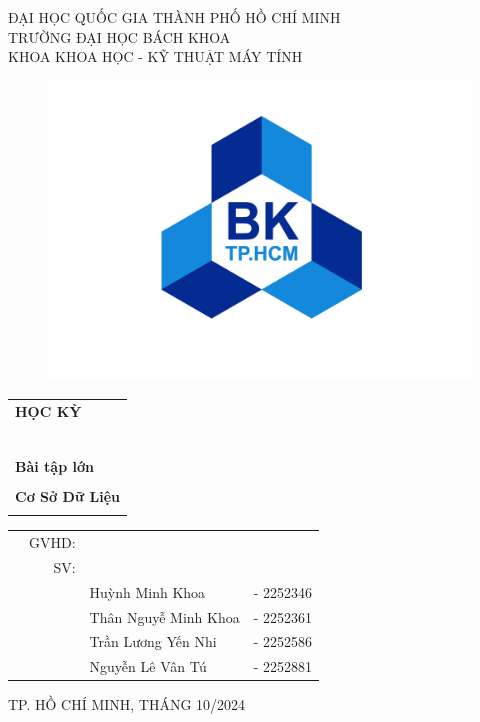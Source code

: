 \documentclass[a4paper]{article}
\begin{document}
\setlength{\parindent}{0.5cm}

\begin{titlepage}
\begin{center}
ĐẠI HỌC QUỐC GIA THÀNH PHỐ HỒ CHÍ MINH \\
TRƯỜNG ĐẠI HỌC BÁCH KHOA \\
KHOA KHOA HỌC - KỸ THUẬT MÁY TÍNH 
\end{center}

\begin{figure}[h!]
\begin{center}
\includegraphics[scale = 0.27]{01_logobachkhoasang.png}
\end{center}
\end{figure}


\begin{center}
\begin{tabular}{c}
	\multicolumn{1}{l}{\textbf{{\Large HỌC KỲ }}}\\
	~~\\
	\hline
	\\
	\multicolumn{1}{l}{\textbf{{\Large Bài tập lớn}}}\\
	\\
	
	\textbf{{\Huge Cơ Sở Dữ Liệu}}\\
	\\
	\hline
\end{tabular}
\end{center}

\begin{table}[h]
\begin{tabular}{rrll}
\hspace{2.5 cm} & GVHD: & &\\
& SV: &  &\\
& &   Huỳnh Minh Khoa&- 2252346\\
& &Thân Nguyễ Minh Khoa &- 2252361\\
& & Trần Lương Yến Nhi &- 2252586\\
 & & Nguyễn Lê Vân Tú&- 2252881\\
\end{tabular}
\end{table}

\begin{center}
{\footnotesize TP. HỒ CHÍ MINH, THÁNG 10/2024}
\end{center}
\end{titlepage}
\end{document}
